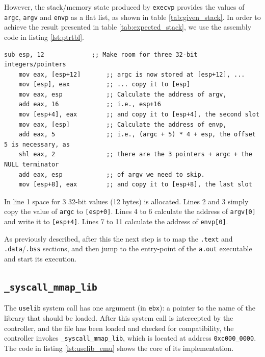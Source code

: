 \documentclass[draft,final]{vutinfth} %
\begin{document}
However, the stack/memory state produced by \texttt{execvp} provides the values of \texttt{argc}, \texttt{argv} and \texttt{envp} as a flat list, as shown in table \ref{tab:given_stack}. In order to achieve the result presented in table \ref{tab:expected_stack}, we use the assembly code in listing \ref{lst:ptrtbl}.

\begin{lstlisting}[language={[x86masm]Assembler}, caption={Assembly used to prepare the pointer table required by \texttt{a.out} executables}, label={lst:ptrtbl}]
    sub esp, 12             ;; Make room for three 32-bit integers/pointers
    mov eax, [esp+12]       ;; argc is now stored at [esp+12], ...
    mov [esp], eax          ;; ... copy it to [esp]
    mov eax, esp            ;; Calculate the address of argv,
    add eax, 16             ;; i.e., esp+16
    mov [esp+4], eax        ;; and copy it to [esp+4], the second slot
    mov eax, [esp]          ;; Calculate the address of envp,
    add eax, 5              ;; i.e., (argc + 5) * 4 + esp, the offset 5 is necessary, as
    shl eax, 2              ;; there are the 3 pointers + argc + the NULL terminator 
    add eax, esp            ;; of argv we need to skip.
    mov [esp+8], eax        ;; and copy it to [esp+8], the last slot
\end{lstlisting}

In line 1 space for 3 32-bit values (12 bytes) is allocated. Lines 2 and 3 simply copy the value of \texttt{argc} to \texttt{[esp+0]}. Lines 4 to 6 calculate the address of \texttt{argv[0]} and write it to \texttt{[esp+4]}. Lines 7 to 11 calculate the address of \texttt{envp[0]}.

As previously described, after this the next step is to map the \texttt{.text} and \texttt{.data}/\texttt{.bss} sections, and then jump to the entry-point of the \texttt{a.out} executable and start its execution.

\subsection{\texttt{\_syscall\_mmap\_lib}}

The \texttt{uselib} system call has one argument (in \texttt{ebx}\cite{SyscallRef}): a pointer to the name of the library that should be loaded. After this system call is intercepted by the controller, and the file has been loaded and checked for compatibility, the controller invokes \texttt{\_syscall\_mmap\_lib}, which is located at address \texttt{0xc000\_0000}. The code in listing \ref{lst:uselib_emu} shows the core of its implementation.
\end{document}
